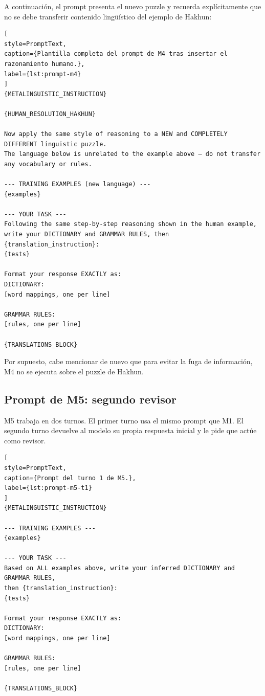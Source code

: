 A continuación, el prompt presenta el nuevo puzzle y recuerda explícitamente que no se debe transferir contenido lingüístico del ejemplo de Hakhun:

\begin{lstlisting}[
style=PromptText,
caption={Plantilla completa del prompt de M4 tras insertar el razonamiento humano.},
label={lst:prompt-m4}
]
{METALINGUISTIC_INSTRUCTION}

{HUMAN_RESOLUTION_HAKHUN}

Now apply the same style of reasoning to a NEW and COMPLETELY DIFFERENT linguistic puzzle.
The language below is unrelated to the example above — do not transfer any vocabulary or rules.

--- TRAINING EXAMPLES (new language) ---
{examples}

--- YOUR TASK ---
Following the same step-by-step reasoning shown in the human example,
write your DICTIONARY and GRAMMAR RULES, then {translation_instruction}:
{tests}

Format your response EXACTLY as:
DICTIONARY:
[word mappings, one per line]

GRAMMAR RULES:
[rules, one per line]

{TRANSLATIONS_BLOCK}
\end{lstlisting}

Por supuesto, cabe mencionar de nuevo que para evitar la fuga de información, M4 no se ejecuta sobre el puzzle de Hakhun.

\subsection{Prompt de M5: segundo revisor}
\label{subsec:prompt-m5}

M5 trabaja en dos turnos. El primer turno usa el mismo prompt que M1. El segundo turno devuelve al modelo su propia respuesta inicial y le pide que actúe como revisor.

\begin{lstlisting}[
style=PromptText,
caption={Prompt del turno 1 de M5.},
label={lst:prompt-m5-t1}
]
{METALINGUISTIC_INSTRUCTION}

--- TRAINING EXAMPLES ---
{examples}

--- YOUR TASK ---
Based on ALL examples above, write your inferred DICTIONARY and GRAMMAR RULES,
then {translation_instruction}:
{tests}

Format your response EXACTLY as:
DICTIONARY:
[word mappings, one per line]

GRAMMAR RULES:
[rules, one per line]

{TRANSLATIONS_BLOCK}
\end{lstlisting}

